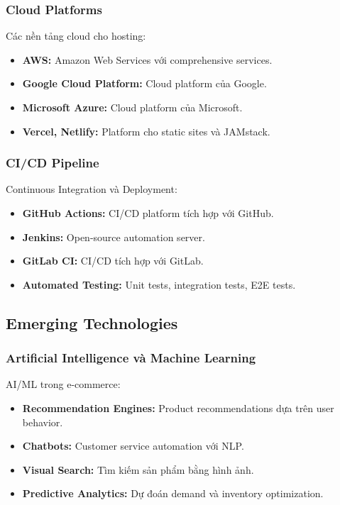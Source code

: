 \documentclass[a4paper,12pt]{report}
\begin{document}
\subsubsection{Cloud Platforms}
Các nền tảng cloud cho hosting:
\begin{itemize}
    \item \textbf{AWS:} Amazon Web Services với comprehensive services.
    \item \textbf{Google Cloud Platform:} Cloud platform của Google.
    \item \textbf{Microsoft Azure:} Cloud platform của Microsoft.
    \item \textbf{Vercel, Netlify:} Platform cho static sites và JAMstack.
\end{itemize}

\subsubsection{CI/CD Pipeline}
Continuous Integration và Deployment:
\begin{itemize}
    \item \textbf{GitHub Actions:} CI/CD platform tích hợp với GitHub.
    \item \textbf{Jenkins:} Open-source automation server.
    \item \textbf{GitLab CI:} CI/CD tích hợp với GitLab.
    \item \textbf{Automated Testing:} Unit tests, integration tests, E2E tests.
\end{itemize}

\subsection{Emerging Technologies}

\subsubsection{Artificial Intelligence và Machine Learning}
AI/ML trong e-commerce:
\begin{itemize}
    \item \textbf{Recommendation Engines:} Product recommendations dựa trên user behavior.
    \item \textbf{Chatbots:} Customer service automation với NLP.
    \item \textbf{Visual Search:} Tìm kiếm sản phẩm bằng hình ảnh.
    \item \textbf{Predictive Analytics:} Dự đoán demand và inventory optimization.
\end{itemize}
\end{document}

